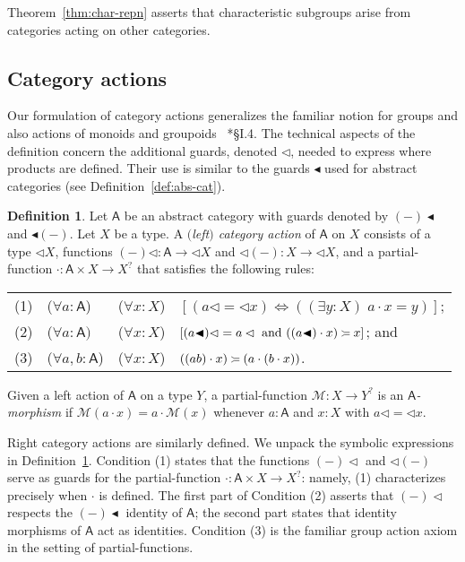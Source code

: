 \documentclass{amsart}
\newcommand{\Cat}[1]{\mathsf{#1}}
\newcommand{\cat}[1]{\Cat{#1}}
\newcommand{\acat}[1]{\mathsf{#1}}
\newcommand{\Caps}[1]{\mathsf{#1}}
\numberwithin{lstfloat}{section}
\newcommand{\srcfunc}{\mathbin{\blacktriangleleft}}
\newcommand{\tgtfunc}{\mathbin{\blacktriangleleft}}
\newcommand{\src}[1]{#1\srcfunc}
\newcommand{\tgt}[1]{\tgtfunc #1}
\newcommand{\func}[1]{\mathcal{#1}}
\newcommand{\fM}{\func{M}}
\newcommand{\cA}{\cat{A}}
\newcommand{\aX}{\Caps{X}}
\newcommand{\aY}{\Caps{Y}}
\newcommand{\venturi}{%
  \mathrel{
    \begin{tikzpicture}[yscale=0.6,xscale=0.5]
        \draw (0ex,2.5ex) to (1ex,2ex);
        \draw (1ex,2ex) to (3ex,2ex);
        \draw (0ex,0.75ex) to (1ex,1.25ex);
        \draw (1ex,1.25ex) to (3ex,1.25ex);
    \end{tikzpicture}
  }
}
\theoremstyle{definition}
\newtheorem{defn}[thm]{Definition}
\theoremstyle{remark}
\numberwithin{equation}{section}
\begin{document}
Theorem~\ref{thm:char-repn} asserts that characteristic subgroups arise from categories
acting on other categories. 

\subsection{Category actions}
\label{sec:cat-acts-biacts}
Our formulation of category actions generalizes the familiar notion for groups
and also actions of monoids and groupoids ~\cite{MonoidsAC}*{\S I.4}. The
technical aspects of the definition concern the additional guards, denoted
$\lhd$, needed to express where products are defined. Their use is similar to
the guards $\blacktriangleleft$ used for abstract categories (see
Definition~\ref{def:abs-cat}). 

\newcommand{\actX}{\aX} 
\newcommand{\actY}{\aY}
\newcommand{\biactionpair}{biaction pair}
\newcommand{\myopp}{\lhd X}

\begin{defn}
\label{def:cat-act}
  Let $\cA$ be an abstract category with guards denoted by $\src{(-)}$ and
  $\tgt{(-)}$. Let $X$ be a type. A \emph{$($left$)$ category action} of
  $\cA$ on $X$ consists of a type $\myopp$, functions 
  $(-)\lhd:\cA\to \myopp$ and $\lhd(-):X\to \myopp$, and a 
  partial-function $\cdot: \cA\times X\to X^?$ that satisfies the following 
  rules: \\[1ex]
  \hspace*{0.5cm}\begin{tabular}{llll}
    (1) & ($\forall a:\cA$) & ($\forall x:X$) &  $\left[(a\lhd=\lhd x)\iff ((\exists y:X)\; a\cdot x=y)\right]$;\\[0.5ex]
    (2) & ($\forall a:\cA)$  & ($\forall x:X$) & $\left[(\src{a})\lhd=a\lhd\text{ and } ((\src{a})\cdot x) \venturi x\right]$; and\\[0.5ex]
    (3) & ($\forall a,b:\cA$) & ($\forall x:X$) &  $((ab)\cdot x) \venturi (a\cdot (b\cdot x))$.
  \end{tabular}

\vspace*{1ex}
  
  Given a left action of $\cA$ on a type $Y$, a partial-function $\fM:X\to Y^?$
  is an \emph{$\cA$-morphism} if $\fM(a\cdot x) = a \cdot \fM(x)$ whenever
  $a:\cA$ and $x:X$ with $a\lhd=\lhd x$.
\end{defn}

Right category actions are similarly defined. 
We unpack the symbolic expressions in Definition~\ref{def:cat-act}. Condition
(1) states that the functions $(-)\lhd$ and $\lhd (-)$ serve as guards for the
partial-function $\cdot : \cA\times X\to X^?$: namely, (1)
characterizes precisely when $\cdot$ is defined. The first part of Condition (2)
asserts that $(-)\lhd$ respects the $\src{(-)}$ identity of $\acat{A}$; the
second part states that identity morphisms of $\acat{A}$ act as identities.
Condition (3) is the familiar group action axiom in the setting of
partial-functions.
\end{document}
